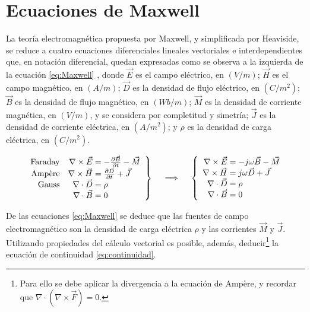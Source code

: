 \section{Ecuaciones de Maxwell}
\label{subsec_ecuaciones_maxwell}
La teoría electromagnética propuesta por Maxwell, y simplificada por Heaviside, se reduce a cuatro ecuaciones diferenciales lineales vectoriales e interdependientes que, en notación diferencial, quedan expresadas como se observa a la izquierda de la ecuación \ref{eq:Maxwell} \cite{Pozar:MwEngineering}, donde $\vec{E}$ es el campo eléctrico, en $(V/m)$; $\vec{H}$ es el campo magnético, en $(A/m)$; $\vec{D}$ es la densidad de flujo eléctrico, en $(C/m^2)$; $\vec{B}$ es la densidad de flujo magnético, en $(Wb/m)$; $\vec{M}$ es la densidad de corriente magnética, en $(V/m)$, y se considera por completitud y simetría; $\vec{J}$ es la densidad de corriente eléctrica, en $(A/m^2)$; y $\rho$ es la densidad de carga eléctrica, en $(C/m^2)$.

\begin{align}
\label{eq:Maxwell}
\left.\begin{array}{rr@{\mskip\thickmuskip}l}
\text{Faraday} &\nabla \times \vec{E} & = -\frac{\partial \vec{B}}{\partial t} - \vec{M}\\
\text{Ampère} &\nabla \times \vec{H} & = \frac{\partial \vec{D}}{\partial t} + \vec{J} \\
\text{Gauss} &\nabla \cdot \vec{D} & = \rho \\
& \nabla \cdot \vec{B} & = 0
\end{array} \right\}
\quad \implies \quad
\left\{\begin{array}{r@{\mskip\thickmuskip}l}
\nabla \times \vec{E} & = -j \omega \vec{B} - \vec{M} \\
\nabla \times \vec{H} & = j \omega \vec{D} + \vec{J} \\
\nabla \cdot \vec{D} & = \rho\\
\nabla \cdot \vec{B} & = 0
\end{array}\right.
\end{align}

De las ecuaciones \ref{eq:Maxwell} se deduce que las fuentes de campo electromagnético son la densidad de carga eléctrica $\rho$ y las corrientes $\vec{M}$ y $\vec{J}$. Utilizando propiedades del cálculo vectorial es posible, además, deducir\footnote{Para ello se debe aplicar la divergencia a la ecuación de Ampère, y recordar que $\nabla \cdot (\nabla \times \vec{F}) = 0$.} la ecuación de continuidad \ref{eq:continuidad}.

